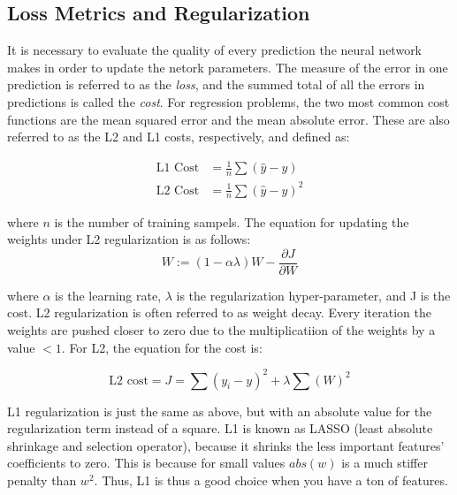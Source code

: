 \subsection{Loss Metrics and Regularization}
It is necessary to evaluate the quality of every prediction the neural network makes in order to update the netork parameters. The measure of the error in one prediction is referred to as the \textit{loss}, and the summed total of all the errors in predictions is called the \textit{cost}. For regression problems, the two most common cost functions are the mean squared error and the mean absolute error. These are also referred to as the L2 and L1 costs, respectively, and defined as:

\begin{align}
    \label{eqn:lossFunctions}
    \text{L1 Cost} &= \frac{1}{n} \sum \left( \hat{y} - y \right) \\
    \text{L2 Cost} &= \frac{1}{n} \sum \left( \hat{y} - y \right)^2
\end{align}

\noindent where $ n $ is the number of training sampels. The equation for updating the weights under L2 regularization is as follows:
\begin{equation}
    W := (1-\alpha \lambda)W - \frac{\partial J}{\partial W}  
\end{equation}

\noindent where $\alpha$ is the learning rate, $\lambda$ is the regularization hyper-parameter, and J is the cost. L2 regularization is often referred to as weight decay. Every iteration the weights are pushed closer to zero due to the multiplicatiion of the weights by a value $<1$. For L2, the equation for the cost is:

\begin{equation}
\text{L2 cost} = J = \sum (y_i - y)^2 + \lambda \sum (W)^2
\end{equation}

L1 regularization is just the same as above, but with an absolute value for the regularization term instead of a square. L1 is known as LASSO (least absolute shrinkage and selection operator), because it shrinks the less important features' coefficients to zero. This is because for small values $abs(w)$ is a much stiffer penalty than $w^2$. Thus, L1 is thus a good choice when you have a ton of features.




